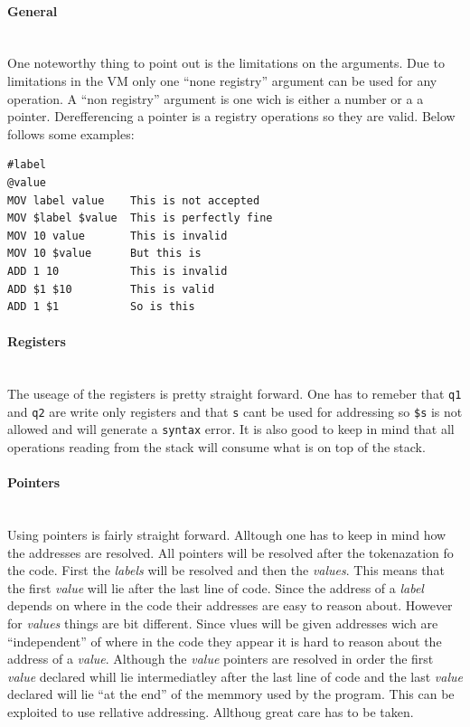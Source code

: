 \documentclass{article}
\newcommand{\V}{\verb}
\begin{document}
\paragraph{General} \ 
\\
One noteworthy thing to point out is the limitations on the arguments. Due to
limitations in the VM only one ``none registry'' argument can be used for any
operation. A ``non registry'' argument is one wich is either a number or a
a pointer. Derefferencing a pointer is a registry operations so they are valid.
Below follows some examples:
\begin{verbatim}
#label
@value
MOV label value    This is not accepted
MOV $label $value  This is perfectly fine
MOV 10 value       This is invalid
MOV 10 $value      But this is
ADD 1 10           This is invalid
ADD $1 $10         This is valid
ADD 1 $1           So is this
\end{verbatim}

\paragraph{Registers} \ 
\\
The useage of the registers is pretty straight forward. One has to remeber that
\V+q1+ and \V+q2+ are write only registers and that \V+s+ cant be used for
addressing so \verb+$s+ is not allowed and will generate a \verb+syntax+ error.
It is also good to keep in mind that all operations reading from the stack will
consume what is on top of the stack.

\paragraph{Pointers} \
\\
Using pointers is fairly straight forward. Alltough one has to keep in mind how
the addresses are resolved. All pointers will be resolved after the
tokenazation fo the code. First the \emph{labels} will be resolved and then the
\emph{values}.
This means that the first \emph{value} will lie after the last line of code. Since the
address of a \emph{label} depends on where in the code their addresses are easy to
reason about. However for \emph{values} things are bit different. Since vlues
will be given addresses wich are ``independent'' of where in the code they appear it is
hard to reason about the address of a \emph{value}. Although the \emph{value} pointers are
resolved in order the first \emph{value} declared whill lie intermediatley after the
last line of code and the last \emph{value} declared will lie ``at the end'' of the
memmory used by the program. This can be exploited to use rellative addressing.
Allthoug great care has to be taken.
\end{document}

